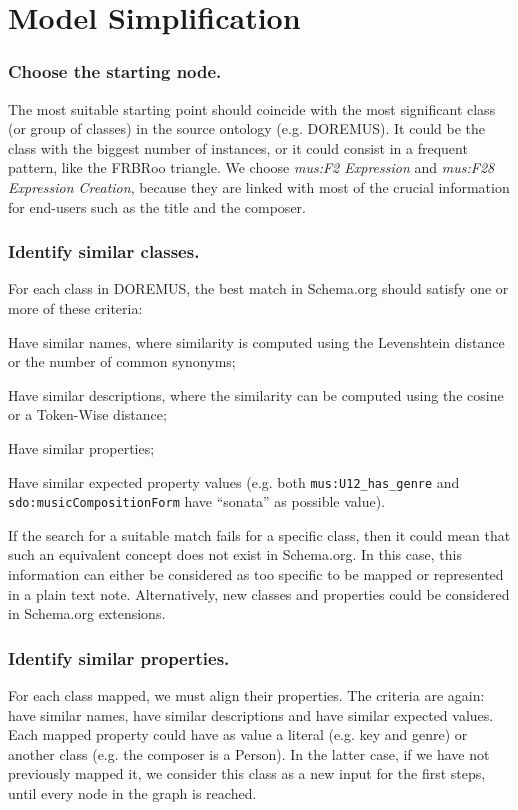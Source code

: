 \documentclass{llncs}
\begin{document}

\section{Model Simplification}
\label{sec:simplification}

\subsubsection{Choose the starting node.}
The most suitable starting point should coincide with the most significant class (or group of classes) in the source ontology (e.g. DOREMUS). It could be the class with the biggest number of instances, or it could consist in a frequent pattern, like the FRBRoo triangle. We choose \textit{mus:F2 Expression} and \textit{mus:F28 Expression Creation}, because they are linked with most of the crucial information for end-users such as the title and the composer.

\subsubsection{Identify similar classes.}
\label{sec:classmap}
For each class in DOREMUS, the best match in Schema.org should satisfy one or more of these criteria:
\begin{enumerate*}
 \item Have similar names, where similarity is computed using the Levenshtein distance or the number of common synonyms;
 \item Have similar descriptions, where the similarity can be computed using the cosine or a Token-Wise distance;
 \item Have similar properties;
 \item Have similar expected property values (e.g. both \texttt{mus:U12\_has\_genre} and \texttt{sdo:musicCompositionForm} have ``sonata'' as possible value).
\end{enumerate*}
If the search for a suitable match fails for a specific class, then it could mean that such an equivalent concept does not exist in Schema.org. In this case, this information can either be considered as too specific to be mapped or represented in a plain text note. Alternatively, new classes and properties could be considered in Schema.org extensions.

\subsubsection{Identify similar properties.}
For each class mapped, we must align their properties. The criteria are again: have similar names, have similar descriptions and have similar expected values. Each mapped property could have as value a literal (e.g. key and genre) or another class (e.g. the composer is a Person). In the latter case, if we have not previously mapped it, we consider this class as a new input for the first steps, until every node in the graph is reached.
\end{document}
